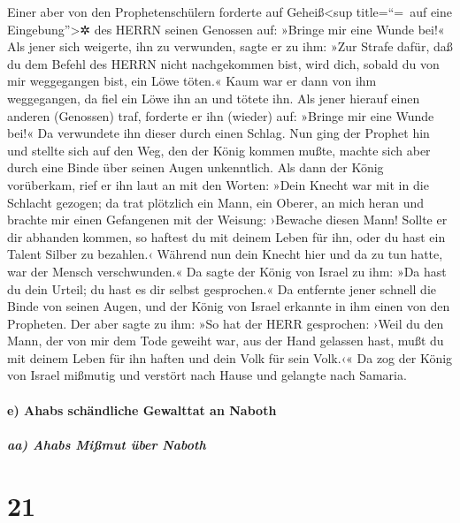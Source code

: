 Einer aber von den Prophetenschülern forderte auf
Geheiß\textless sup title=``=~auf eine Eingebung''\textgreater✲ des
HERRN seinen Genossen auf: »Bringe mir eine Wunde bei!« Als jener sich
weigerte, ihn zu verwunden, sagte er zu ihm: »Zur Strafe
dafür, daß du dem Befehl des HERRN nicht nachgekommen bist, wird dich,
sobald du von mir weggegangen bist, ein Löwe töten.« Kaum war er dann
von ihm weggegangen, da fiel ein Löwe ihn an und tötete ihn.
Als jener hierauf einen anderen (Genossen) traf, forderte
er ihn (wieder) auf: »Bringe mir eine Wunde bei!« Da verwundete ihn
dieser durch einen Schlag. Nun ging der Prophet hin und
stellte sich auf den Weg, den der König kommen mußte, machte sich aber
durch eine Binde über seinen Augen unkenntlich. Als dann
der König vorüberkam, rief er ihn laut an mit den Worten: »Dein Knecht
war mit in die Schlacht gezogen; da trat plötzlich ein Mann, ein Oberer,
an mich heran und brachte mir einen Gefangenen mit der Weisung: ›Bewache
diesen Mann! Sollte er dir abhanden kommen, so haftest du mit deinem
Leben für ihn, oder du hast ein Talent Silber zu bezahlen.‹
Während nun dein Knecht hier und da zu tun hatte, war der
Mensch verschwunden.« Da sagte der König von Israel zu ihm: »Da hast du
dein Urteil; du hast es dir selbst gesprochen.« Da
entfernte jener schnell die Binde von seinen Augen, und der König von
Israel erkannte in ihm einen von den Propheten. Der aber
sagte zu ihm: »So hat der HERR gesprochen: ›Weil du den Mann, der von
mir dem Tode geweiht war, aus der Hand gelassen hast, mußt du mit deinem
Leben für ihn haften und dein Volk für sein Volk.‹« Da
zog der König von Israel mißmutig und verstört nach Hause und gelangte
nach Samaria.

\hypertarget{e-ahabs-schuxe4ndliche-gewalttat-an-naboth}{%
\paragraph{e) Ahabs schändliche Gewalttat an
Naboth}\label{e-ahabs-schuxe4ndliche-gewalttat-an-naboth}}

\hypertarget{aa-ahabs-miuxdfmut-uxfcber-naboth}{%
\subparagraph{aa) Ahabs Mißmut über
Naboth}\label{aa-ahabs-miuxdfmut-uxfcber-naboth}}

\hypertarget{section-20}{%
\section{21}\label{section-20}}

